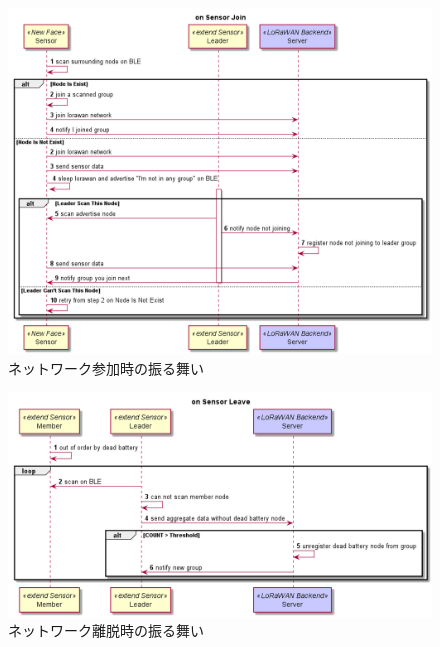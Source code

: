 \begin{figure}[]
    \begin{center}
    \includegraphics[width=14cm]{figures/グループ化_ネットワーク参加時.png}
    \caption{ネットワーク参加時の振る舞い}
    \label{fig:group_on_join}
    \end{center}
\end{figure}


\begin{figure}[]
    \begin{center}
    \includegraphics[width=14cm]{figures/グループ化_ネットワーク離脱時.png}
    \caption{ネットワーク離脱時の振る舞い}
    \label{fig:group_on_leave}
    \end{center}
\end{figure}
